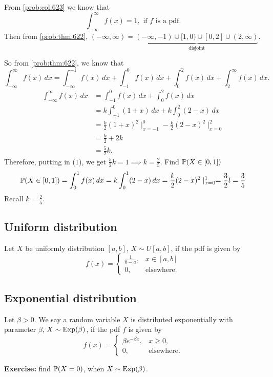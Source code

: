 \documentclass[10pt, a4paper]{article}
\begin{document}
From \autoref{prob:col:623} we know that
\begin{equation}
    \int_{-\infty}^{\infty}f(x) = 1,\text{ if } f \text{ is a pdf}.
\end{equation}
Then from \autoref{prob:thm:622},
$(-\infty, \infty) = \underbrace{(-\infty, -1) \cup [1, 0) \cup [0, 2] \cup (2, \infty)}_{\text{disjoint}}$.

So from \autoref{prob:thm:622},
we know that
\[
\int_{-\infty}^{\infty}f(x)\,dx = \int_{-\infty}^{-1}f(x)\,dx + \int_{-1}^0f(x)\,dx + \int_0^2f(x)\,dx + \int_2^{\infty}f(x)\,dx.
\]
\begin{align*}
    \int_{-\infty}^{\infty}f(x)\,dx &= \int_{-1}^{0}f(x)\,dx + \int_0^2f(x)\,dx \\
    &= k\int_{-1}^0(1 + x)\,dx + k\int_0^2(2 - x)\,dx \\
    &= \frac{k}{2}(1 + x) ^ 2\mid^0_{x = -1} - \frac{k}{2}(2 - x) ^ 2\mid^2_{x = 0} \\
    &= \frac{k}{2} + 2k \\
    &= \frac{5}{2}k.
\end{align*}
Therefore,
putting in ($1$),
we get $\frac{5}{2}k = 1 \implies k = \frac{2}{5}$.
Find $\P(X \in [0, 1])$
\[
\P(X \in [0, 1]) = \int_0^1f(x)\,dx = k\int_0^1(2 - x)\,dx = \frac{k}{2}(2 - x) ^ 2\mid_{x = 0}^1 = \frac{3}{2}l = \frac{3}{5}
\]
Recall $k = \frac{2}{5}$.

\subsection{Uniform distribution}
\begin{definition}
    Let $X$ be uniformly distribution $[a, b]$,
    $X \sim U[a, b]$,
    if the pdf is given by
    \[
    f(x) = \begin{cases}
        \frac{1}{b - a}, & x \in [a, b] \\
        0, & \text{elsewhere}.
    \end{cases}
    \]
\end{definition}

\subsection{Exponential distribution}
\begin{definition}
    Let $\beta > 0$.
    We say a random variable $X$ is distributed exponentially with parameter $\beta$,
    $X \sim \Exp(\beta)$,
    if the pdf $f$ is given by
    \[
    f(x) = \begin{cases}
        \beta e ^ {-\beta x}, & x \geq 0, \\
        0, & \text{elsewhere}.
    \end{cases}
    \]
\end{definition}
\textbf{Exercise:} find $\P(X = 0)$,
when $X \sim \Exp(\beta)$.
\end{document}
